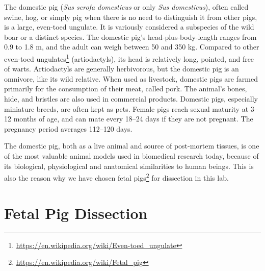 \documentclass[]{book}
\let\rmarkdownfootnote\footnote%
\def\footnote{\protect\rmarkdownfootnote}
\renewcommand{\href}[2]{#2\footnote{\url{#1}}}
\let\BeginKnitrBlock\begin \let\EndKnitrBlock\end
\begin{document}
The domestic pig (\emph{Sus scrofa domesticus} or only \emph{Sus domesticus}), often called swine, hog, or simply pig when there is no need to distinguish it from other pigs, is a large, even-toed ungulate. It is variously considered a subspecies of the wild boar or a distinct species. The domestic pig's head-plus-body-length ranges from 0.9 to 1.8 m, and the adult can weigh between 50 and 350 kg. Compared to other \href{https://en.wikipedia.org/wiki/Even-toed_ungulate}{even-toed ungulates} (artiodactyls), its head is relatively long, pointed, and free of warts. Artiodactyls are generally herbivorous, but the domestic pig is an omnivore, like its wild relative. When used as livestock, domestic pigs are farmed primarily for the consumption of their meat, called pork. The animal's bones, hide, and bristles are also used in commercial products. Domestic pigs, especially miniature breeds, are often kept as pets. Female pigs reach sexual maturity at 3--12 months of age, and can mate every 18--24 days if they are not pregnant. The pregnancy period averages 112--120 days.

\BeginKnitrBlock{rmdnote}
The domestic pig, both as a live animal and source of post-mortem tissues, is one of the most valuable animal models used in biomedical research today, because of its biological, physiological and anatomical similarities to human beings. This is also the reason why we have chosen \href{https://en.wikipedia.org/wiki/Fetal_pig}{fetal pigs} for dissection in this lab.
\EndKnitrBlock{rmdnote}

\hypertarget{fetal-pig-dissection}{%
\section{Fetal Pig Dissection}\label{fetal-pig-dissection}}
\end{document}
